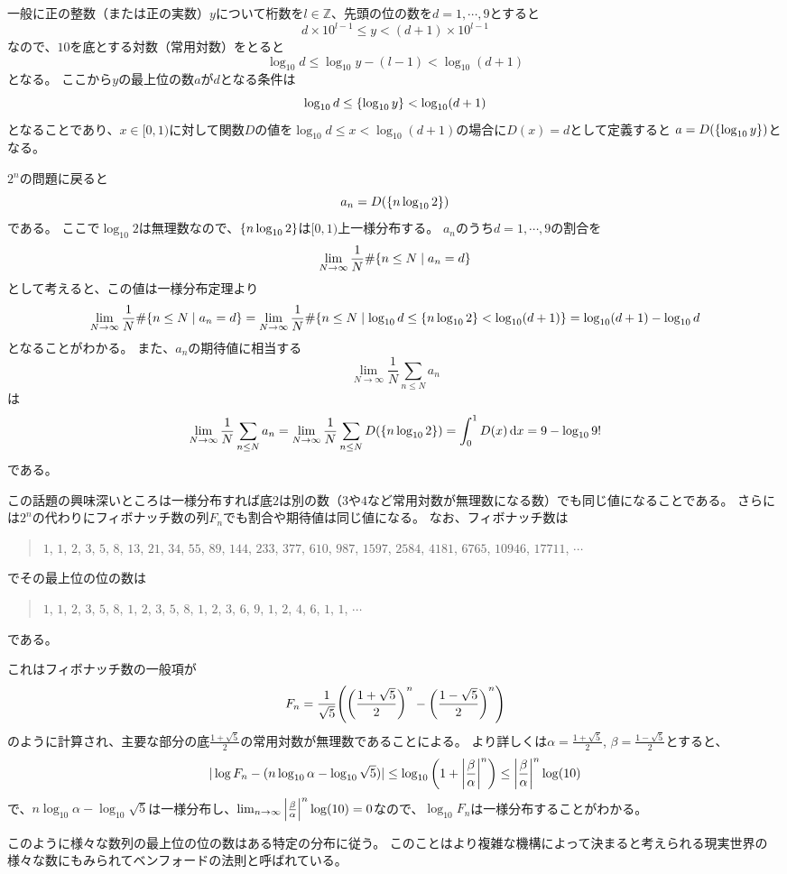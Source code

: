 一般に正の整数（または正の実数）$y$について桁数を$l \in \mathbb{Z}$、先頭の位の数を$d = 1, \cdots, 9$とすると
$$
d\times 10^{l-1} \le y < (d+1)\times 10^{l-1}
$$
なので、$10$を底とする対数（常用対数）をとると
$$
\log_{10}d \le \log_{10}y-(l-1) < \log_{10}(d+1)
$$
となる。
ここから$y$の最上位の数$a$が$d$となる条件は
$$
\log_{10}d \le \{\log_{10}y\} < \log_{10}(d+1)
$$
となることであり、$x \in [0, 1)$に対して関数$D$の値を$\log_{10}d \le x < \log_{10}(d+1)$の場合に$D(x) = d$として定義すると
$a = D(\{\log_{10}y\})$となる。

$2^n$の問題に戻ると
$$
a_n = D(\{n\log_{10}2\})
$$
である。
ここで$\log_{10}2$は無理数なので、$\{n\log_{10}2\}$は$[0, 1)$上一様分布する。
$a_n$のうち$d = 1, \cdots, 9$の割合を
$$
\lim_{N \to \infty}\frac{1}{N}\#\{ n \le N \mid a_n = d \}
$$
として考えると、この値は一様分布定理より
$$
\lim_{N \to \infty}\frac{1}{N}\#\{ n \le N \mid a_n = d \}
= \lim_{N \to \infty}\frac{1}{N}\#\{ n \le N \mid \log_{10}d \le \{n\log_{10}2\} < \log_{10}(d+1) \}
= \log_{10}(d+1)-\log_{10}d
$$
となることがわかる。
また、$a_n$の期待値に相当する
$$
\lim_{N \to \infty}\frac{1}{N}\sum_{n \le N}a_n
$$
は
$$
\lim_{N \to \infty}\frac{1}{N}\sum_{n \le N}a_n
= \lim_{N \to \infty}\frac{1}{N}\sum_{n \le N}D(\{n\log_{10}2\})
= \int_0^1 D(x)\dd{x}
= 9-\log_{10}9!
$$
である。

この話題の興味深いところは一様分布すれば底$2$は別の数（$3$や$4$など常用対数が無理数になる数）でも同じ値になることである。
さらには$2^n$の代わりにフィボナッチ数の列$F_n$でも割合や期待値は同じ値になる。
なお、フィボナッチ数は
\begin{quote}
$1$, $1$, $2$, $3$, $5$, $8$, $13$, $21$, $34$, $55$, $89$, $144$, $233$, $377$, $610$, $987$, $1597$, $2584$, $4181$, $6765$, $10946$, $17711$, $\cdots$
\end{quote}
でその最上位の位の数は
\begin{quote}
$1$, $1$, $2$, $3$, $5$, $8$, $1$, $2$, $3$, $5$, $8$, $1$, $2$, $3$, $6$, $9$, $1$, $2$, $4$, $6$, $1$, $1$, $\cdots$
\end{quote}
である。

これはフィボナッチ数の一般項が
$$
F_n = \frac{1}{\sqrt{5}}\qty(\qty(\frac{1+\sqrt{5}}{2})^n-\qty(\frac{1-\sqrt{5}}{2})^n)
$$
のように計算され、主要な部分の底$\frac{1+\sqrt{5}}{2}$の常用対数が無理数であることによる。
より詳しくは$\alpha = \frac{1+\sqrt{5}}{2}$, $\beta = \frac{1-\sqrt{5}}{2}$とすると、
$$
|\log F_n-(n\log_{10}\alpha-\log_{10}\sqrt{5})| \le \log_{10}\qty(1+\abs{\frac{\beta}{\alpha}}^n) \le \abs{\frac{\beta}{\alpha}}^n\log(10)
$$
で、$n\log_{10}\alpha-\log_{10}\sqrt{5}$は一様分布し、$\lim_{n \to \infty}\abs{\frac{\beta}{\alpha}}^n\log(10) = 0$なので、$\log_{10}F_n$は一様分布することがわかる。

このように様々な数列の最上位の位の数はある特定の分布に従う。
このことはより複雑な機構によって決まると考えられる現実世界の様々な数にもみられてベンフォードの法則と呼ばれている。
